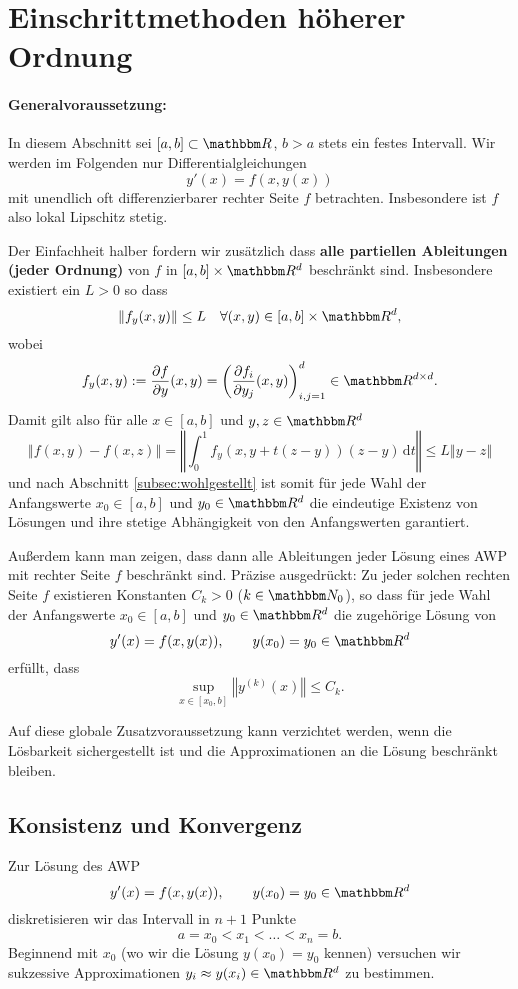 \documentclass[12pt,a4paper]{book}
\theoremstyle{break}
\theoremstyle{nonumberplain}
\newcommand{\N}{\mathbbm N}
\newcommand{\R}{\mathbbm R}
\newcommand{\norm}[1]{\left\Vert#1\right\Vert}		%
\newcommand{\1}{\mathbbm{1}} 			      	%
\newcommand{\dx}[1][x]{\ensuremath{\, \mathrm{d} #1}} 	%
\begin{document}
\section{Einschrittmethoden höherer Ordnung}

\paragraph{Generalvoraussetzung:} In diesem Abschnitt sei $[a,b]\subset \R$, $b>a$ stets ein festes Intervall. Wir werden im Folgenden nur Differentialgleichungen
\[
y'(x)=f(x,y(x))
\]
mit unendlich oft differenzierbarer rechter Seite $f$ betrachten. Insbesondere ist $f$ also lokal Lipschitz stetig.

Der Einfachheit halber fordern wir zusätzlich dass \textbf{alle partiellen Ableitungen (jeder Ordnung)} von $f$ in $[a,b]\times \R^d$ beschränkt sind.
Insbesondere existiert ein $L>0$ so dass
\[
\norm{f_y(x,y)}\leq L \quad \forall (x,y)\in [a,b]\times \R^d,
\]
wobei 
\[
f_y(x,y):=\frac{\partial f}{\partial y} (x,y)= \left( \frac{\partial f_i}{\partial y_j}(x,y) \right)_{i,j=1}^d\in \R^{d\times d}.
\]
Damit gilt also für alle $x\in [a,b]$ und $y,z\in \R^d$ 
\[
\norm{f(x,y)-f(x,z)}=\norm{\int_0^1 f_y(x,y+t(z-y)) (z-y) \dx[t]}\leq L \norm{y-z}
\]
und nach Abschnitt \ref{subsec:wohlgestellt} ist somit für jede Wahl der Anfangswerte $x_0\in [a,b]$ und $y_0\in \R^d$ die eindeutige Existenz von Lösungen und ihre stetige Abhängigkeit von den Anfangswerten garantiert.

Außerdem kann man zeigen, dass dann alle Ableitungen jeder Lösung eines AWP mit rechter 
Seite $f$ beschränkt sind. Präzise ausgedrückt: Zu jeder solchen rechten Seite $f$ existieren Konstanten $C_k>0$ ($k\in \N_0$), so dass für jede Wahl der Anfangswerte $x_0\in [a,b]$ und $y_0\in \R^d$ die zugehörige 
Lösung von 
\[
y'(x)=f(x,y(x)), \qquad y(x_0)=y_0\in \R^d
\]
erfüllt, dass
\[
\sup_{x\in [x_0,b]} \norm{y^{(k)}(x)} \leq C_k.
\]

Auf diese globale Zusatzvoraussetzung kann verzichtet werden, wenn die Lösbarkeit sichergestellt ist und die Approximationen an die Lösung beschränkt bleiben.


\subsection{Konsistenz und Konvergenz}\label{subsect:ConsitencyOrder}

Zur Lösung des AWP
\[
y'(x)=f(x,y(x)), \qquad y(x_0)=y_0\in \R^d
\]
diskretisieren wir das Intervall in $n+1$ Punkte
\[
a=x_0 < x_1 < \ldots < x_n=b.
\]
Beginnend mit $x_0$ (wo wir die Lösung $y(x_0)=y_0$ kennen) versuchen wir sukzessive Approximationen $y_i\approx y(x_i)\in \R^d$ zu bestimmen.
\end{document}
